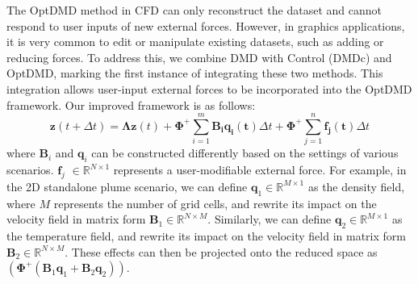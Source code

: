 The OptDMD method in CFD can only reconstruct the dataset and cannot respond to user inputs of new external forces. However, in graphics applications, it is very common to edit or manipulate existing datasets, such as adding or reducing forces. To address this, we combine DMD with Control (DMDc) \cite{proctor2016dynamic} and OptDMD, marking the first instance of integrating these two methods. This integration allows user-input external forces to be incorporated into the OptDMD framework. Our improved framework is as follows:
\begin{equation}
    \label{eqn:external_forces}
    \bm{z}(t + \Delta t) = \bm{\Lambda} \bm{z}(t) + \bm{\Phi^+} \sum_{i = 1}^m\bm{B_i} \bm{q_i(t)} \Delta t + \bm{\Phi^+} \sum_{j = 1}^n\bm{f_j(t)} \Delta t
\end{equation}
where $\bm B_i$ and $\bm q_i$ can be constructed differently based on the settings of various scenarios. $\bm f_j$ $\in \mathbb{R}^{N\times 1}$ represents a user-modifiable external force. For example, in the 2D standalone plume scenario, we can define $\bm q_1 \in \mathbb{R}^{M \times 1}$ as the density field, where $M$ represents the number of grid cells, and rewrite its impact on the velocity field in matrix form $\bm B_1 \in \mathbb{R}^{N \times M}$. Similarly, we can define $\bm q_2 \in \mathbb{R}^{M \times 1}$ as the temperature field, and rewrite its impact on the velocity field in matrix form $\bm B_2 \in \mathbb{R}^{N \times M}$. These effects can then be projected onto the reduced space as $(\bm \Phi^+ (\bm B_1 \bm q_1 + \bm B_2 \bm q_2))$.